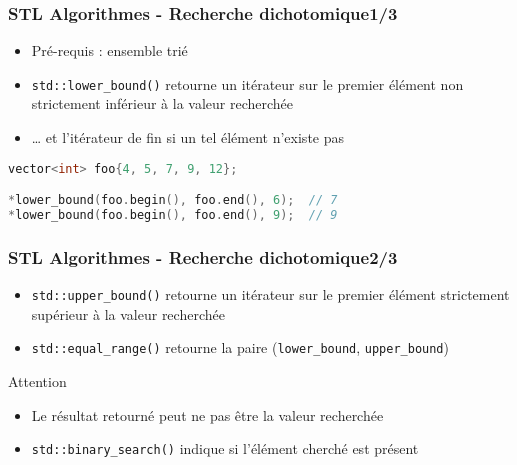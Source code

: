 \documentclass[C++.tex]{subfiles}
\begin{document}
\begin{frame}[fragile]
	\frametitle{STL Algorithmes - Recherche dichotomique\titlehfill{}1/3}
	\begin{itemize}
		\item Pré-requis : ensemble trié
		
		
		\item \lstinline|std::lower_bound()| retourne un itérateur sur le premier élément non strictement inférieur à la valeur recherchée


		\item \ldots{} et l'itérateur de fin si un tel élément n'existe pas
	\end{itemize}

	\begin{lstlisting}[language=C++]
vector<int> foo{4, 5, 7, 9, 12};

*lower_bound(foo.begin(), foo.end(), 6);  // 7
*lower_bound(foo.begin(), foo.end(), 9);  // 9\end{lstlisting}
\end{frame}

\begin{frame}[fragile]
	\frametitle{STL Algorithmes - Recherche dichotomique\titlehfill{}2/3}
	\begin{itemize}
		\item \lstinline|std::upper_bound()| retourne un itérateur sur le premier élément strictement supérieur à la valeur recherchée 
		\item \lstinline|std::equal_range()| retourne la paire (\lstinline|lower_bound|, \lstinline|upper_bound|)
	\end{itemize}

	\begin{alertblock}{Attention}
		\begin{itemize}
			\item Le résultat retourné peut ne pas être la valeur recherchée
		\end{itemize}
	\end{alertblock}

	\begin{itemize}
		\item \lstinline|std::binary_search()| indique si l'élément cherché est présent
	\end{itemize}
\end{frame}
\end{document}
